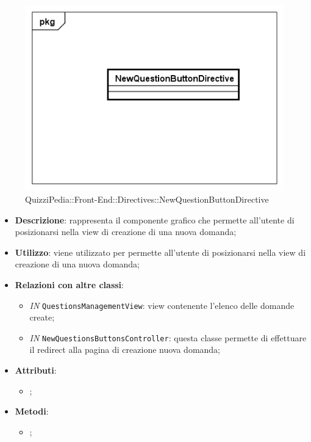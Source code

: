 \label{QuizziPedia::Front-End::Directives::NewQuestionButtonDirective}

\begin{figure}[ht]
	\centering
	\includegraphics[scale=0.5,keepaspectratio]{UML/Classi/Front-End/QuizziPedia_Front-end_Directives_NewQuestionButtonDirective.png}
	\caption{QuizziPedia::Front-End::Directives::NewQuestionButtonDirective}
\end{figure} \FloatBarrier

\begin{itemize}
	\item \textbf{Descrizione}: rappresenta il componente grafico che permette all'utente di posizionarsi nella view di creazione di una nuova domanda;
	\item \textbf{Utilizzo}: viene utilizzato per permette all'utente di posizionarsi nella view di creazione di una nuova domanda;
	\item \textbf{Relazioni con altre classi}: 
	\begin{itemize}
		\item \textit{IN} \texttt{QuestionsManagementView}: view contenente l'elenco delle domande create; 
		\item \textit{IN} \texttt{NewQuestionsButtonsController}: questa classe permette di effettuare il redirect alla pagina di creazione nuova domanda;
	\end{itemize}
	\item \textbf{Attributi}: 
	\begin{itemize}
		\item ;
	\end{itemize}
	\item \textbf{Metodi}: 
	\begin{itemize}
		\item ;
	\end{itemize}
\end{itemize}


